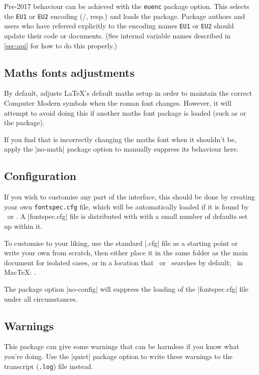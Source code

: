 Pre-2017 behaviour can be achieved with the \texttt{euenc} package option.
This selects the \texttt{EU1} or \texttt{EU2} encoding (\XeTeX/\LuaTeX, resp.) and loads the  package.
Package authors and users who have referred explicitly to the encoding names \texttt{EU1} or \texttt{EU2} should update their code or documents.
(See internal variable names described in \vref{sec:api} for how to do this properly.)


\subsection{Maths fonts adjustments}
By default,  adjusts \LaTeX's default maths setup in order to maintain the correct Computer Modern symbols when the roman font changes.
However, it will attempt to avoid doing this if another maths font package is loaded (such as  or the  package).

If you find that  is incorrectly changing the maths font when it shouldn't be, apply the |no-math| package option to manually suppress its behaviour here.


\subsection{Configuration}
\label{sec:config}

If you wish to customise any part of the
 interface, this should be done by creating your own
\texttt{fontspec.cfg} file,
which will be automatically loaded if it is found by \XeTeX\ or \LuaTeX.
A |fontspec.cfg| file is distributed with  with a small number of defaults set up within it.

To customise  to your liking, use the standard |.cfg| file as a starting point or write your own from scratch, then either place it in the same folder as the main document for isolated cases, or in a location
that \XeTeX\ or \LuaTeX\ searches by default; \eg\ in Mac\TeX: .

The package option |no-config| will suppress the loading of the |fontspec.cfg| file under all circumstances.


\subsection{Warnings}
\label{sec:quiet-warnings}

This package can give some warnings that can be harmless if you know what
you're doing. Use the |quiet| package option to write these warnings to the
transcript (\texttt{.log}) file instead.

